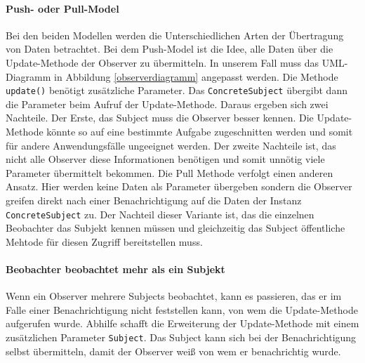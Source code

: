 \paragraph{Push- oder Pull-Model} 


Bei den beiden Modellen werden die Unterschiedlichen Arten der Übertragung von Daten betrachtet. Bei dem Push-Model ist die Idee, alle Daten über die Update-Methode der Observer zu übermitteln. In unserem Fall muss das UML-Diagramm in Abbildung \ref{observerdiagramm} angepasst werden. Die Methode \texttt{update()} benötigt  zusätzliche Parameter. Das \texttt{ConcreteSubject} übergibt dann die Parameter beim Aufruf der Update-Methode.
Daraus ergeben sich zwei Nachteile. Der Erste, das Subject muss die Observer besser kennen. Die Update-Methode könnte so auf eine bestimmte Aufgabe zugeschnitten werden und somit für andere Anwendungsfälle ungeeignet werden. Der zweite Nachteile ist, das nicht alle Observer diese Informationen benötigen und somit unnötig viele Parameter übermittelt bekommen.
Die Pull Methode verfolgt einen anderen Ansatz. Hier werden keine Daten als Parameter übergeben sondern die Observer greifen direkt nach einer Benachrichtigung auf die Daten der Instanz \texttt{ConcreteSubject} zu. Der Nachteil dieser Variante ist, das die einzelnen Beobachter das Subjekt kennen müssen und gleichzeitig das Subject öffentliche Mehtode für diesen Zugriff bereitstellen muss.


\paragraph{Beobachter beobachtet mehr als ein Subjekt} Wenn ein Observer mehrere Subjects beobachtet, kann es passieren, das er im Falle einer Benachrichtigung nicht feststellen kann, von wem die Update-Methode aufgerufen wurde. Abhilfe schafft die Erweiterung der Update-Methode mit einem zusätzlichen Parameter \texttt{Subject}. Das Subject kann sich bei der Benachrichtigung selbst übermitteln, damit der Observer weiß von wem er benachrichtig wurde.

